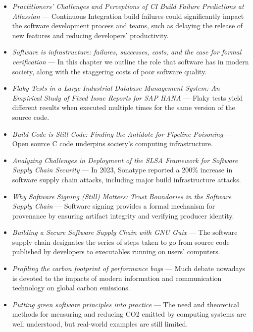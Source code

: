 \documentclass[11pt,a4paper]{article}
\providecommand{\textcite}[1]{\cite{#1}}
\begin{document}
\begin{itemize}[leftmargin=1.3em,itemsep=2pt]
\item \textcite{arxiv2402_09651} \emph{Practitioners' Challenges and Perceptions of CI Build Failure Predictions at Atlassian} --- Continuous Integration build failures could significantly impact the software development process and teams, such as delaying the release of new features and reducing developers' productivity.
\item \textcite{arxiv2506_13821} \emph{Software is infrastructure: failures, successes, costs, and the case for formal verification} --- In this chapter we outline the role that software has in modern society, along with the staggering costs of poor software quality.
\item \textcite{arxiv2602_03556} \emph{Flaky Tests in a Large Industrial Database Management System: An Empirical Study of Fixed Issue Reports for SAP HANA} --- Flaky tests yield different results when executed multiple times for the same version of the source code.
\item \textcite{arxiv2601_08995} \emph{Build Code is Still Code: Finding the Antidote for Pipeline Poisoning} --- Open source C code underpins society's computing infrastructure.
\item \textcite{arxiv2409_05014} \emph{Analyzing Challenges in Deployment of the SLSA Framework for Software Supply Chain Security} --- In 2023, Sonatype reported a 200\% increase in software supply chain attacks, including major build infrastructure attacks.
\item \textcite{arxiv2510_04964} \emph{Why Software Signing (Still) Matters: Trust Boundaries in the Software Supply Chain} --- Software signing provides a formal mechanism for provenance by ensuring artifact integrity and verifying producer identity.
\item \textcite{arxiv2206_14606} \emph{Building a Secure Software Supply Chain with GNU Guix} --- The software supply chain designates the series of steps taken to go from source code published by developers to executables running on users' computers.
\item \textcite{arxiv2401_01782} \emph{Profiling the carbon footprint of performance bugs} --- Much debate nowadays is devoted to the impacts of modern information and communication technology on global carbon emissions.
\item \textcite{arxiv2601_09741} \emph{Putting green software principles into practice} --- The need and theoretical methods for measuring and reducing CO2 emitted by computing systems are well understood, but real-world examples are still limited.

\end{itemize}
\end{document}
